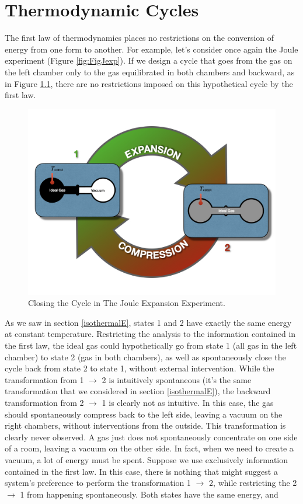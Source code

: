\documentclass[
  9pt,
]{extbook}
\theoremstyle{definition}
\theoremstyle{definition}
\theoremstyle{definition}
\theoremstyle{remark}
\begin{document}
\hypertarget{ThermodynamicCycles}{%
\chapter{Thermodynamic Cycles}\label{ThermodynamicCycles}}

The first law of thermodynamics places no restrictions on the conversion of energy from one form to another. For example, let's consider once again the Joule experiment (Figure \ref{fig:FigJexp}). If we design a cycle that goes from the gas on the left chamber only to the gas equilibrated in both chambers and backward, as in Figure \ref{fig:FigJexpC}, there are no restrictions imposed on this hypothetical cycle by the first law.

\begin{figure}

{\centering \includegraphics[width=0.8\linewidth]{./img/OEP_Figures.008} 

}

\caption{Closing the Cycle in The Joule Expansion Experiment.}\label{fig:FigJexpC}
\end{figure}

As we saw in section \ref{isothermalE}, states 1 and 2 have exactly the same energy at constant temperature. Restricting the analysis to the information contained in the first law, the ideal gas could hypothetically go from state 1 (all gas in the left chamber) to state 2 (gas in both chambers), as well as spontaneously close the cycle back from state 2 to state 1, without external intervention. While the transformation from 1 \(\rightarrow\) 2 is intuitively spontaneous (it's the same transformation that we considered in section \ref{isothermalE}), the backward transformation from 2 \(\rightarrow\) 1 is clearly not as intuitive. In this case, the gas should spontaneously compress back to the left side, leaving a vacuum on the right chambers, without interventions from the outside. This transformation is clearly never observed. A gas just does not spontaneously concentrate on one side of a room, leaving a vacuum on the other side. In fact, when we need to create a vacuum, a lot of energy must be spent. Suppose we use exclusively information contained in the first law. In this case, there is nothing that might suggest a system's preference to perform the transformation 1 \(\rightarrow\) 2, while restricting the 2 \(\rightarrow\) 1 from happening spontaneously. Both states have the same energy, and
\end{document}
